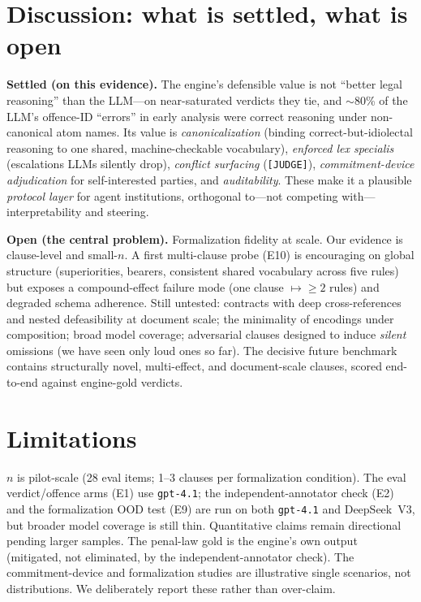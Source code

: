 \documentclass[11pt]{article}
\begin{document}
\section{Discussion: what is settled, what is open}\label{sec:discussion}
\textbf{Settled (on this evidence).} The engine's defensible value is not ``better legal
reasoning'' than the LLM---on near-saturated verdicts they tie, and $\sim$80\% of the LLM's
offence-ID ``errors'' in early analysis were correct reasoning under non-canonical atom names.
Its value is \emph{canonicalization} (binding correct-but-idiolectal reasoning to one shared,
machine-checkable vocabulary), \emph{enforced lex specialis} (escalations LLMs silently drop),
\emph{conflict surfacing} (\texttt{[JUDGE]}), \emph{commitment-device adjudication} for
self-interested parties, and \emph{auditability}. These make it a plausible \emph{protocol layer}
for agent institutions, orthogonal to---not competing with---interpretability and steering.

\textbf{Open (the central problem).} Formalization fidelity at scale. Our evidence is
clause-level and small-$n$. A first multi-clause probe (E10) is encouraging on global structure
(superiorities, bearers, consistent shared vocabulary across five rules) but exposes a
compound-effect failure mode (one clause $\mapsto \geq 2$ rules) and degraded schema adherence.
Still untested: contracts with deep cross-references and nested defeasibility at document scale;
the minimality of encodings under composition; broad model coverage; adversarial clauses designed
to induce \emph{silent} omissions (we have seen only loud ones so far). The decisive future
benchmark contains structurally novel, multi-effect, and document-scale clauses, scored
end-to-end against engine-gold verdicts.

\section{Limitations}
$n$ is pilot-scale (28 eval items; 1--3 clauses per formalization condition). The eval verdict/offence arms (E1)
use \texttt{gpt-4.1}; the independent-annotator check (E2) and the formalization OOD test (E9)
are run on both \texttt{gpt-4.1} and DeepSeek~V3, but broader model coverage is still thin.
Quantitative claims remain directional pending larger samples. The penal-law gold is the
engine's own output (mitigated, not eliminated, by the independent-annotator check). The
commitment-device and formalization studies are illustrative single scenarios, not distributions.
We deliberately report these rather than over-claim.
\end{document}

